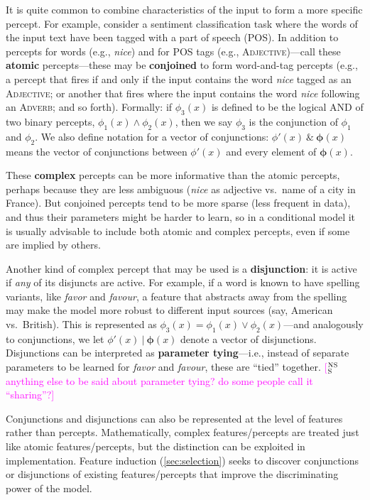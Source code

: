 \documentclass[11pt,letterpaper]{article}
\newcommand{\ensuretext}[1]{#1}
\newcommand{\nssmarker}{\ensuretext{\textcolor{magenta}{\ensuremath{^{\textsc{NS}}_{\textsc{S}}}}}}
\newcommand{\arkcomment}[3]{\ensuretext{\textcolor{#3}{[#1 #2]}}}
\newcommand{\nss}[1]{\arkcomment{\nssmarker}{#1}{magenta}}
\begin{document}
It is quite common to combine characteristics of the input to form a more specific percept.
For example, consider a sentiment classification task where the words of the input text have been 
tagged with a part of speech (POS). In addition to percepts for words (e.g., \textit{nice}) 
and for POS tags (e.g., \textsc{Adjective})---call these \textbf{atomic} percepts---these may be 
\textbf{conjoined} to form word-and-tag percepts (e.g., a percept that fires if and only if the input contains 
the word \textit{nice} tagged as an \textsc{Adjective}; or another that fires where the input contains 
the word \textit{nice} following an \textsc{Adverb}; and so forth).
Formally: if $\phi_3(x)$ is defined to be the logical AND of two binary percepts, $\phi_1(x) \wedge \phi_2(x)$,
then we say $\phi_3$ is the conjunction of $\phi_1$ and $\phi_2$. 
We also define notation for a vector of conjunctions: $\phi'(x)\ \&\  \boldsymbol{\phi}(x)$ means the vector of conjunctions
between $\phi'(x)$ and every element of $\boldsymbol{\phi}(x)$. 

These \textbf{complex} percepts can be more informative than the atomic percepts, 
perhaps because they are less ambiguous (\textit{nice} as adjective vs.~name of a city in France).
But conjoined percepts tend to be more sparse (less frequent in data), and thus their parameters might be harder to learn, 
so in a conditional model it is usually advisable to include both atomic and complex percepts, 
even if some are implied by others.

Another kind of complex percept that may be used is a \textbf{disjunction}: it is active if 
{\em any} of its disjuncts are active. For example, if a word is known to have spelling variants, 
like \textit{favor} and \textit{favour}, a feature that abstracts away from the spelling 
may make the model more robust to different input sources (say, American vs.~British).
This is represented as $\phi_3(x) = \phi_1(x) \vee \phi_2(x)$---and 
analogously to conjunctions, we let $\phi'(x)\ |\ \boldsymbol{\phi}(x)$ denote a vector of disjunctions.
Disjunctions can be interpreted as \textbf{parameter tying}---i.e., instead of separate parameters 
to be learned for \textit{favor} and \textit{favour}, these are ``tied'' together.
\nss{anything else to be said about parameter tying? do some people call it ``sharing''?}

Conjunctions and disjunctions can also be represented at the level of features 
rather than percepts.
Mathematically, complex features/percepts are treated just like atomic features/percepts, 
but the distinction can be exploited in implementation.
Feature induction (\cref{sec:selection}) seeks to discover conjunctions or disjunctions of 
existing features/percepts that improve the discriminating power of the model.
\end{document}

